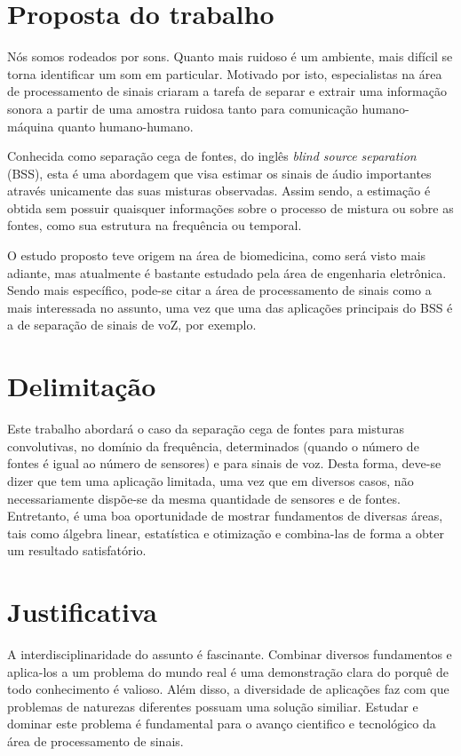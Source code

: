 \section{Proposta do trabalho}

Nós somos rodeados por sons. Quanto mais ruidoso é um ambiente, mais difícil se torna identificar um som em particular. Motivado por isto, especialistas na área de processamento de sinais criaram a tarefa de separar e extrair uma informação sonora a partir de uma amostra ruidosa tanto para comunicação humano-máquina quanto humano-humano. 

Conhecida como separação cega de fontes, do inglês \textit{blind source separation} (BSS), esta é uma abordagem que visa estimar os sinais de áudio importantes através unicamente das suas misturas observadas. Assim sendo, a estimação é obtida sem possuir quaisquer informações sobre o processo de mistura ou sobre as fontes, como sua estrutura na frequência ou temporal.

O estudo proposto teve origem na área de biomedicina, como será visto mais adiante, mas atualmente é bastante estudado pela área de engenharia eletrônica. Sendo mais específico, pode-se citar a área de processamento de sinais como a mais interessada no assunto, uma vez que uma das aplicações principais do BSS é a de separação de sinais de voZ, por exemplo.

\section{Delimitação}

Este trabalho abordará o caso da separação cega de fontes para misturas convolutivas, no domínio da frequência, determinados (quando o número de fontes é igual ao número de sensores) e para sinais de voz. Desta forma, deve-se dizer que tem uma aplicação limitada, uma vez que em diversos casos, não necessariamente dispõe-se da mesma quantidade de sensores e de fontes. Entretanto, é uma boa oportunidade de mostrar fundamentos de diversas áreas, tais como álgebra linear, estatística e otimização e combina-las de forma a obter um resultado satisfatório.


\section{Justificativa}

A interdisciplinaridade do assunto é fascinante. Combinar diversos fundamentos e aplica-los a um problema do mundo real é uma demonstração clara do porquê de todo conhecimento é valioso. Além disso, a diversidade de aplicações faz com que problemas de naturezas diferentes possuam uma solução similiar. Estudar e dominar este problema é fundamental para o avanço cientifico e tecnológico da área de processamento de sinais.


